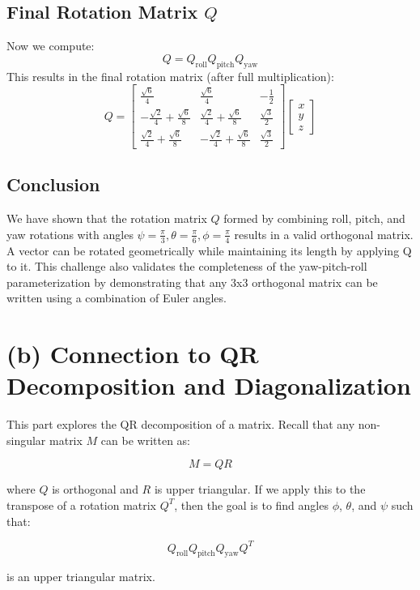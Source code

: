 \documentclass[12pt]{article}
\begin{document}
\subsection*{Final Rotation Matrix $Q$}
Now we compute:
\[
Q = Q_{\text{roll}} Q_{\text{pitch}} Q_{\text{yaw}}
\]
This results in the final rotation matrix (after full multiplication):
\[
Q = \begin{bmatrix}
\frac{\sqrt{6}}{4} & \frac{\sqrt{6}}{4} & -\frac{1}{2} \\
-\frac{\sqrt{2}}{4} + \frac{\sqrt{6}}{8} & \frac{\sqrt{2}}{4} + \frac{\sqrt{6}}{8} & \frac{\sqrt{3}}{2} \\
\frac{\sqrt{2}}{4} + \frac{\sqrt{6}}{8} & -\frac{\sqrt{2}}{4} + \frac{\sqrt{6}}{8} & \frac{\sqrt{3}}{2}
\end{bmatrix}
\begin{bmatrix}
    x \\ y \\ z
\end{bmatrix}
\]

\subsection*{Conclusion}
We have shown that the rotation matrix $Q$ formed by combining roll, pitch, and yaw rotations with angles $\psi = \frac{\pi}{3}, \theta = \frac{\pi}{6}, \phi = \frac{\pi}{4}$ results in a valid orthogonal matrix. A vector can be rotated geometrically while maintaining its length by applying Q to it. This challenge also validates the completeness of the yaw-pitch-roll parameterization by demonstrating that any 3x3 orthogonal matrix can be written using a combination of Euler angles.

\section*{(b) Connection to QR Decomposition and Diagonalization}

This part explores the QR decomposition of a matrix. Recall that any non-singular matrix $M$ can be written as:

\[
M = QR
\]

where $Q$ is orthogonal and $R$ is upper triangular. If we apply this to the transpose of a rotation matrix $Q^T$, then the goal is to find angles $\phi$, $\theta$, and $\psi$ such that:

\[
Q_{\text{roll}} Q_{\text{pitch}} Q_{\text{yaw}} Q^T
\]

is an upper triangular matrix.
\end{document}
